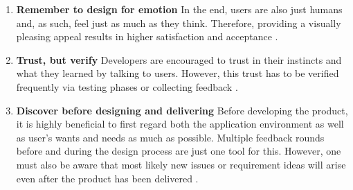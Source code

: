 \documentclass[draft,final]{vutinfth} %
\begin{document}
\begin{enumerate}
\item \textbf{Remember to design for emotion} In the end, users are also just humans and, as such, feel just as much as they think. Therefore, providing a visually pleasing appeal results in higher satisfaction and acceptance \cite{still2017fundamentals}.
\item \textbf{Trust, but verify} Developers are encouraged to trust in their instincts and what they learned by talking to users. However, this trust has to be verified frequently via testing phases or collecting feedback \cite{morgan2004360}.
\item \textbf{Discover before designing and delivering} Before developing the product, it is highly beneficial to first regard both the application environment as well as user's wants and needs as much as possible. Multiple feedback rounds before and during the design process are just one tool for this. However, one must also be aware that most likely new issues or requirement ideas will arise even after the product has been delivered \cite{still2017fundamentals}.
\end{enumerate}
\end{document}
